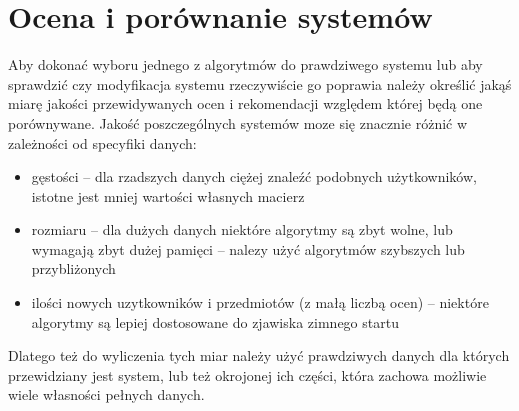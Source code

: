 \documentclass{pracamgr}
\begin{document}
 \chapter{Ocena i porównanie systemów}
  Aby dokonać wyboru jednego z algorytmów do prawdziwego systemu lub aby sprawdzić czy modyfikacja systemu rzeczywiście go poprawia należy
  określić jakąś miarę jakości przewidywanych ocen i rekomendacji względem której będą one porównywane.\newline
  Jakość poszczególnych systemów moze się znacznie różnić w zależności od specyfiki danych:
  \begin{itemize}\itemsep1pt \parskip0pt 
   \item gęstości -- dla rzadszych danych ciężej znaleźć podobnych użytkowników, istotne jest mniej wartości własnych macierz
   \item rozmiaru -- dla dużych danych niektóre algorytmy są zbyt wolne, lub wymagają zbyt dużej pamięci
          -- nalezy użyć algorytmów szybszych lub przybliżonych 
   \item ilości nowych uzytkowników i przedmiotów (z małą liczbą ocen) -- niektóre algorytmy są lepiej dostosowane do zjawiska zimnego startu
  \end{itemize}
  Dlatego też do wyliczenia tych miar należy użyć prawdziwych danych dla których przewidziany jest system, lub też okrojonej ich części,
  która zachowa możliwie wiele własności pełnych danych.
\end{document}
